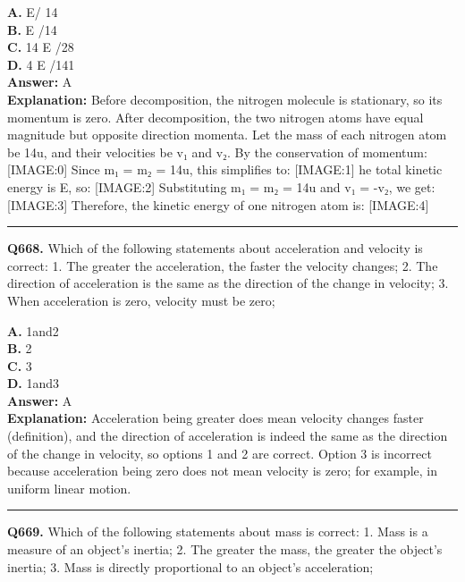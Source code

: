 \documentclass[12pt]{article}
\begin{document}
\textbf{A.} E/
14​ \\
\textbf{B.} E
​/14 \\
\textbf{C.} 14
E
​/28 \\
\textbf{D.} 4
E
​/141 \\

\textbf{Answer:} A \\
\textbf{Explanation:} Before decomposition, the nitrogen molecule is stationary, so its momentum is zero. After decomposition, the two nitrogen atoms have equal magnitude but opposite direction momenta. Let the mass of each nitrogen atom be 14u, and their velocities be v₁ and v₂. By the conservation of momentum:
[IMAGE:0]
Since m₁ = m₂ = 14u, this simplifies to:
[IMAGE:1]
he total kinetic energy is E, so:
[IMAGE:2]
Substituting m₁ = m₂ = 14u and v₁ = -v₂, we get:
[IMAGE:3]
Therefore, the kinetic energy of one nitrogen atom is:
[IMAGE:4]

\hrule
\vspace{1em}


\noindent
\textbf{Q668.} Which of the following statements about acceleration and velocity is correct:
1.
The greater the acceleration, the faster the velocity changes;
2.
The direction of acceleration is the same as the direction of the change in velocity;
3.
When acceleration is zero, velocity must be zero;



\textbf{A.} 1and2 \\
\textbf{B.} 2 \\
\textbf{C.} 3 \\
\textbf{D.} 1and3 \\

\textbf{Answer:} A \\
\textbf{Explanation:} Acceleration being greater does mean velocity changes faster (definition), and the direction of acceleration is indeed the same as the direction of the change in velocity, so options 1 and 2 are correct. Option 3 is incorrect because acceleration being zero does not mean velocity is zero; for example, in uniform linear motion.

\hrule
\vspace{1em}


\noindent
\textbf{Q669.} Which of the following statements about mass is correct:
1.
Mass is a measure of an object's inertia;
2.
The greater the mass, the greater the object's inertia;
3.
Mass is directly proportional to an object's acceleration;
\end{document}
